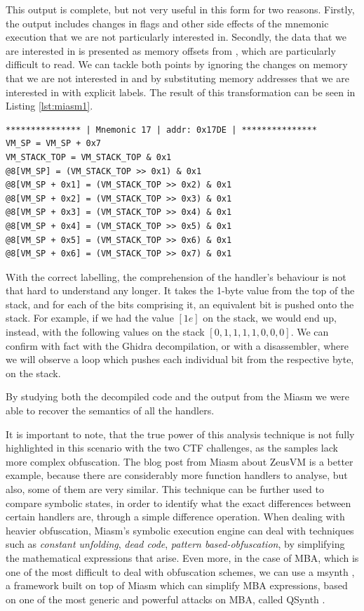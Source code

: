 This output is complete, but not very useful in this form for two reasons. Firstly, the output includes changes in flags and other side effects of the mnemonic execution that we are not particularly interested in. Secondly, the data that we are interested in is presented as memory offsets from , which are particularly difficult to read. We can tackle both points by ignoring the changes on memory that we are not interested in and by substituting memory addresses that we are interested in with explicit labels. The result of this transformation can be seen in Listing \ref{lst:miasm1}.

\begin{lstlisting}[label={lst:miasm1}, caption={TODO}]
*************** | Mnemonic 17 | addr: 0x17DE | ***************
VM_SP = VM_SP + 0x7
VM_STACK_TOP = VM_STACK_TOP & 0x1
@8[VM_SP] = (VM_STACK_TOP >> 0x1) & 0x1
@8[VM_SP + 0x1] = (VM_STACK_TOP >> 0x2) & 0x1
@8[VM_SP + 0x2] = (VM_STACK_TOP >> 0x3) & 0x1
@8[VM_SP + 0x3] = (VM_STACK_TOP >> 0x4) & 0x1
@8[VM_SP + 0x4] = (VM_STACK_TOP >> 0x5) & 0x1
@8[VM_SP + 0x5] = (VM_STACK_TOP >> 0x6) & 0x1
@8[VM_SP + 0x6] = (VM_STACK_TOP >> 0x7) & 0x1
\end{lstlisting}

With the correct labelling, the comprehension of the handler's behaviour is not that hard to understand any longer. It takes the 1-byte value from the top of the stack, and for each of the bits comprising it, an equivalent bit is pushed onto the stack. For example, if we had the value $[1e]$ on the stack, we would end up, instead, with the following values on the stack $[0, 1, 1, 1, 1, 0, 0, 0]$. We can confirm with fact with the Ghidra decompilation, or with a disassembler, where we will observe a loop which pushes each individual bit from the respective byte, on the stack. 

By studying both the decompiled code and the output from the Miasm we were able to recover the semantics of all the handlers. 

It is important to note, that the true power of this analysis technique is not fully highlighted in this scenario with the two \gls{CTF} challenges, as the samples lack more complex obfuscation. The blog post from Miasm about ZeusVM \cite{zeusvm_miasm} is a better example, because there are considerably more function handlers to analyse, but also, some of them are very similar. This technique can be further used to compare symbolic states, in order to identify what the exact differences between certain handlers are, through a simple difference operation. When dealing with heavier obfuscation, Miasm's symbolic execution engine can deal with techniques such as \emph{constant unfolding}, \emph{dead code}, \emph{pattern based-obfuscation}, by simplifying the mathematical expressions that arise. Even more, in the case of \gls{MBA}, which is one of the most difficult to deal with obfuscation schemes, we can use a msynth \cite{msynth}, a framework built on top of Miasm which can simplify \gls{MBA} expressions, based on one of the most generic and powerful attacks on \gls{MBA}, called QSynth \cite{qsynth}.

